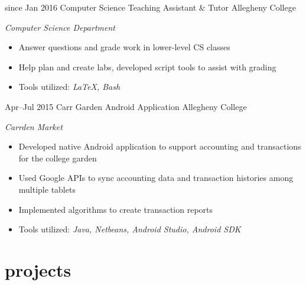 \documentclass[]{friggeri-cv}
\begin{document}
\begin{entrylist}
  \entry
    {since Jan 2016}
    {Computer Science Teaching Assistant \& Tutor}
    {Allegheny College}
    {\emph{Computer Science Department}
    \begin{itemize}[leftmargin=1.2em]
    \item Answer questions and grade work in lower-level CS classes
    \item Help plan and create labs, developed script tools to assist with grading
    \item Tools utilized: \emph{\LaTeX , Bash}
    \end{itemize}}
  \entry
    {Apr--Jul 2015}
    {Carr Garden Android Application}
    {Allegheny College}
    {\emph{Carrden Market}
    \begin{itemize}[leftmargin=1.2em]
    \item Developed native Android application to support accounting and transactions for the college garden
    \item Used Google APIs to sync accounting data and transaction histories among multiple tablets
    \item Implemented algorithms to create transaction reports
    \item Tools utilized: \emph{Java, Netbeans, Android Studio, Android SDK}
    \end{itemize}}
\end{entrylist}

\section{projects}
\end{document}
